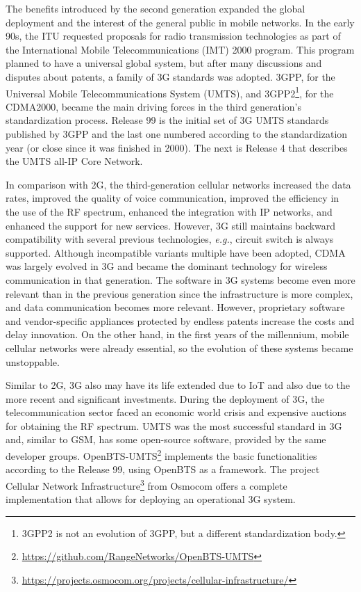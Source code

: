 The benefits introduced by the second generation expanded the global deployment and the interest of the general public in mobile networks. In the early 90s, the ITU requested proposals for radio transmission technologies as part of the International Mobile Telecommunications (IMT) 2000 program. This program planned to have a universal global system, but after many discussions and disputes about patents, a family of 3G standards was adopted. 3GPP, for the Universal Mobile Telecommunications System (UMTS), and 3GPP2\footnote{3GPP2 is not an evolution of 3GPP, but a different standardization body.}, for the CDMA2000, became the main driving forces in the third generation's standardization process. Release 99 is the initial set of 3G UMTS standards published by 3GPP and the last one numbered according to the standardization year (or close since it was finished in 2000). The next is Release 4 that describes the UMTS all-IP Core Network.

In comparison with 2G, the third-generation cellular networks increased the data rates, improved the quality of voice communication, improved the efficiency in the use of the RF spectrum, enhanced the integration with IP networks, and enhanced the support for new services. However, 3G still maintains backward compatibility with several previous technologies, \textit{e.g.}, circuit switch is always supported. Although incompatible variants multiple have been adopted, CDMA was largely evolved in 3G and became the dominant technology for wireless communication in that generation. The software in 3G systems become even more relevant than in the previous generation since the infrastructure is more complex, and data communication becomes more relevant. However, proprietary software and vendor-specific appliances protected by endless patents increase the costs and delay innovation. On the other hand, in the first years of the millennium, mobile cellular networks were already essential, so the evolution of these systems became unstoppable.

Similar to 2G, 3G also may have its life extended due to IoT and also due to the more recent and significant investments. During the deployment of 3G, the telecommunication sector faced an economic world crisis and expensive auctions for obtaining the RF spectrum. UMTS was the most successful standard in 3G and, similar to GSM, has some open-source software, provided by the same developer groups. OpenBTS-UMTS\footnote{\url{https://github.com/RangeNetworks/OpenBTS-UMTS}} implements the basic functionalities according to the Release 99, using OpenBTS as a framework. The project Cellular Network Infrastructure\footnote{\url{https://projects.osmocom.org/projects/cellular-infrastructure/}} from Osmocom offers a complete implementation that allows for deploying an operational 3G system.

